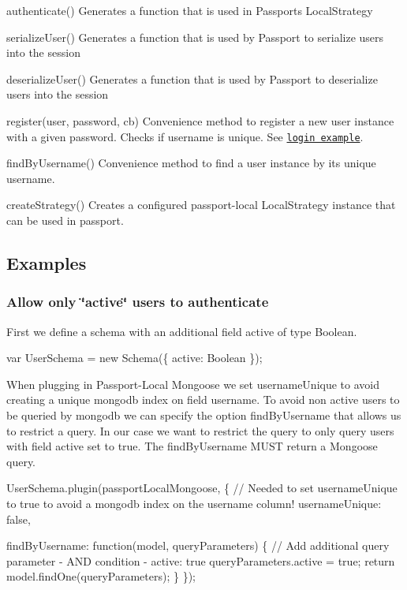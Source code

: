\begin{DoxyItemize}
\item authenticate() Generates a function that is used in Passport\textquotesingle{}s Local\+Strategy
\item serialize\+User() Generates a function that is used by Passport to serialize users into the session
\item deserialize\+User() Generates a function that is used by Passport to deserialize users into the session
\item register(user, password, cb) Convenience method to register a new user instance with a given password. Checks if username is unique. See \href{https://github.com/saintedlama/passport-local-mongoose/tree/master/examples/login}{\tt login example}.
\item find\+By\+Username() Convenience method to find a user instance by it\textquotesingle{}s unique username.
\item create\+Strategy() Creates a configured passport-\/local {\ttfamily Local\+Strategy} instance that can be used in passport.
\end{DoxyItemize}

\subsection*{Examples}

\subsubsection*{Allow only \char`\"{}active\char`\"{} users to authenticate}

First we define a schema with an additional field {\ttfamily active} of type Boolean.


\begin{DoxyCode}
var UserSchema = new Schema(\{
  active: Boolean
\});
\end{DoxyCode}


When plugging in Passport-\/\+Local Mongoose we set {\ttfamily username\+Unique} to avoid creating a unique mongodb index on field {\ttfamily username}. To avoid non active users to be queried by mongodb we can specify the option {\ttfamily find\+By\+Username} that allows us to restrict a query. In our case we want to restrict the query to only query users with field {\ttfamily active} set to {\ttfamily true}. The {\ttfamily find\+By\+Username} M\+U\+ST return a Mongoose query.


\begin{DoxyCode}
UserSchema.plugin(passportLocalMongoose, \{
  // Needed to set usernameUnique to true to avoid a mongodb index on the username column!
  usernameUnique: false,

  findByUsername: function(model, queryParameters) \{
    // Add additional query parameter - AND condition - active: true
    queryParameters.active = true;
    return model.findOne(queryParameters);
  \}
\});
\end{DoxyCode}


